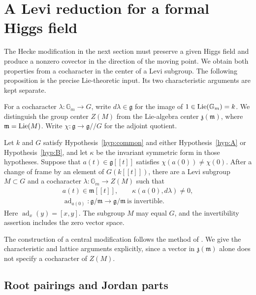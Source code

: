 \section{A Levi reduction for a formal Higgs field}\label{sec:lie}

The Hecke modification in the next section must preserve a given Higgs
field and produce a nonzero covector in the direction of the moving point.
We obtain both properties from a cocharacter in the center of a Levi
subgroup.  The following proposition is the precise Lie-theoretic input.
Its two characteristic arguments are kept separate.

For a cocharacter $\lambda:\mathbb G_m\to G$, write
$d\lambda\in\mathfrak g$ for the image of $1\in\operatorname{Lie}(\mathbb G_m)=k$.
We distinguish the group center $Z(M)$ from the Lie-algebra center
$\mathfrak z(\mathfrak m)$, where $\mathfrak m=\operatorname{Lie}(M)$.
Write $\chi:\mathfrak g\to\mathfrak g/\!/G$ for the adjoint quotient.

\begin{proposition}\label{lie:input}
Let $k$ and $G$ satisfy Hypothesis~\ref{hyp:common} and either
Hypothesis~\ref{hyp:A} or Hypothesis~\ref{hyp:B}, and let $\kappa$ be
the invariant symmetric form in those hypotheses.
Suppose that $a(t)\in\mathfrak g[[t]]$ satisfies
$\chi(a(0))\ne\chi(0)$.  After a change of frame by an element of
$G(k[[t]])$, there are a Levi subgroup $M\subset G$ and a cocharacter
$\lambda:\mathbb G_m\to Z(M)$ such that
\begin{equation}\label{eq:lie-output}
 \begin{gathered}
 a(t)\in\mathfrak m[[t]],\qquad \kappa(a(0),d\lambda)\ne0,\\
 \operatorname{ad}_{a(0)}:\mathfrak g/\mathfrak m\longrightarrow
                   \mathfrak g/\mathfrak m\ \text{is invertible}.
 \end{gathered}
\end{equation}
Here $\operatorname{ad}_x(y)=[x,y]$.  The subgroup $M$ may equal $G$, and the
invertibility assertion includes the zero vector space.
\end{proposition}

The construction of a central modification follows the method of
\cite[\S\S20.4--20.5]{AGKRRV}.  We give the characteristic and lattice
arguments explicitly, since a vector in $\mathfrak z(\mathfrak m)$
alone does not specify a cocharacter of $Z(M)$.

\subsection{Root pairings and Jordan parts}

